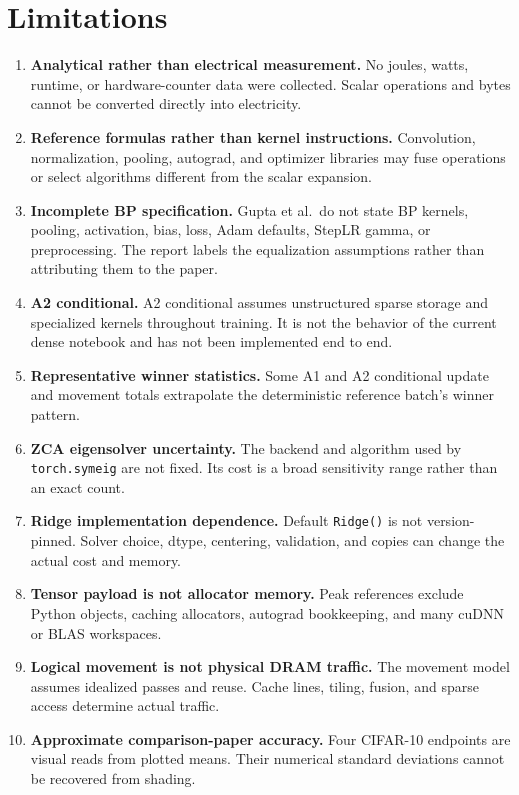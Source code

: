 \documentclass{article}
\begin{document}
    \section{Limitations}
    
    \begin{enumerate}[noitemsep]
    \item \textbf{Analytical rather than electrical measurement.} No joules, watts, runtime, or hardware-counter data were collected. Scalar operations and bytes cannot be converted directly into electricity.
    \item \textbf{Reference formulas rather than kernel instructions.} Convolution, normalization, pooling, autograd, and optimizer libraries may fuse operations or select algorithms different from the scalar expansion.
    \item \textbf{Incomplete BP specification.} Gupta et al.\ do not state BP kernels, pooling, activation, bias, loss, Adam defaults, StepLR gamma, or preprocessing. The report labels the equalization assumptions rather than attributing them to the paper.
    \item \textbf{A2 conditional.} A2 conditional assumes unstructured sparse storage and specialized kernels throughout training. It is not the behavior of the current dense notebook and has not been implemented end to end.
    \item \textbf{Representative winner statistics.} Some A1 and A2 conditional update and movement totals extrapolate the deterministic reference batch's winner pattern.
    \item \textbf{ZCA eigensolver uncertainty.} The backend and algorithm used by \texttt{torch.symeig} are not fixed. Its cost is a broad sensitivity range rather than an exact count.
    \item \textbf{Ridge implementation dependence.} Default \texttt{Ridge()} is not version-pinned. Solver choice, dtype, centering, validation, and copies can change the actual cost and memory.
    \item \textbf{Tensor payload is not allocator memory.} Peak references exclude Python objects, caching allocators, autograd bookkeeping, and many cuDNN or BLAS workspaces.
    \item \textbf{Logical movement is not physical DRAM traffic.} The movement model assumes idealized passes and reuse. Cache lines, tiling, fusion, and sparse access determine actual traffic.
    \item \textbf{Approximate comparison-paper accuracy.} Four CIFAR-10 endpoints are visual reads from plotted means. Their numerical standard deviations cannot be recovered from shading.

\end{enumerate}
\end{document}
